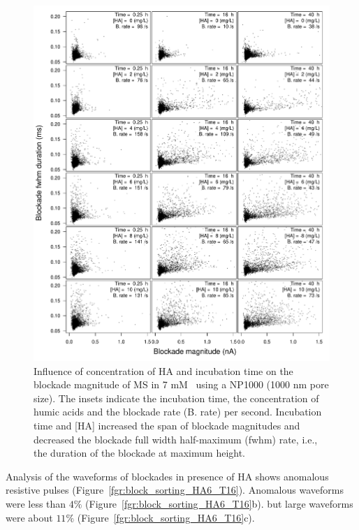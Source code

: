 \documentclass[journal=langd5,manuscript=article]{achemso}
\begin{document}
 \begin{figure}
  \includegraphics[width=\linewidth]{Figures/Scattering_MS_HA_D2_detail.pdf}
  \caption{Influence of concentration of HA and incubation time on the blockade magnitude of MS in 7 mM~ using a NP1000 (1000 nm pore size). The insets indicate the incubation time, the concentration of humic acids and the blockade rate (B. rate) per second. Incubation time and [HA] increased the span of blockade magnitudes and decreased the blockade full  width half-maximum (fwhm) rate, i.e., the duration of the blockade at maximum height.}
\label{fgr:blockades}
\end{figure}



Analysis of the waveforms of blockades in presence of HA shows anomalous resistive pulses
(Figure~\ref{fgr:block_sorting_HA6_T16}).
Anomalous  waveforms were less than  $4\%$
(Figure~\ref{fgr:block_sorting_HA6_T16}b).
but large waveforms were about $11\%$   
(Figure~\ref{fgr:block_sorting_HA6_T16}c).
\end{document}
